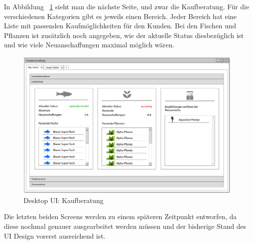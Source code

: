 In Abbildung ~\ref{desktopUI:3} sieht man die nächste Seite, und zwar die Kaufberatung. Für die verschiedenen Kategorien gibt es jeweils einen Bereich. Jeder Bereich hat eine Liste mit passenden Kaufmöglichkeiten für den Kunden. Bei den Fischen und Pflanzen ist zusätzlich noch angegeben, wie der aktuelle Status diesbezüglich ist und wie viele Neuanschaffungen maximal möglich wären.

\begin{figure}[ht!]
\centering
\includegraphics[width=\linewidth]{3Kaufberatung}
\caption{Desktop UI: Kaufberatung}
\label{desktopUI:3}
\end{figure}

Die letzten beiden Screens werden zu einem späteren Zeitpunkt entworfen, da diese nochmal genauer ausgearbeitet werden müssen und der bisherige Stand des UI Design vorerst ausreichend ist.
